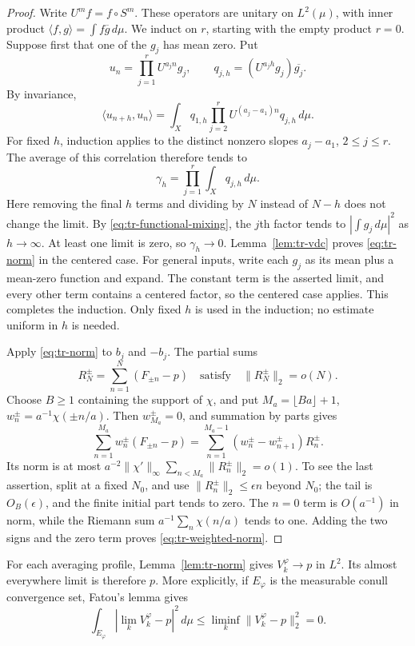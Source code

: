 \begin{proof}
Write \(U^mf=f\circ S^m\).  These operators are unitary on
\(L^2(\mu)\), with inner product
\(\langle f,g\rangle=\int f\overline g\,d\mu\).
We induct on \(r\), starting with the empty product \(r=0\).
Suppose first that one of the \(g_j\) has mean zero.  Put
\[
 u_n=\prod_{j=1}^rU^{a_jn}g_j,
 \qquad q_{j,h}=(U^{a_jh}g_j)\overline{g_j}.
\]
By invariance,
\[
 \langle u_{n+h},u_n\rangle
 =\int_Xq_{1,h}\prod_{j=2}^rU^{(a_j-a_1)n}q_{j,h}\,d\mu.
\]
For fixed \(h\), induction applies to the distinct nonzero slopes
\(a_j-a_1\), \(2\leq j\leq r\).  The average of this correlation
therefore tends to
\[
 \gamma_h=\prod_{j=1}^r\int_Xq_{j,h}\,d\mu.
\]
Here removing the final \(h\) terms and dividing by \(N\) instead
of \(N-h\) does not change the limit.  By
\eqref{eq:tr-functional-mixing}, the \(j\)th factor tends to
\(|\int g_j\,d\mu|^2\) as \(h\to\infty\).  At least one limit
is zero, so \(\gamma_h\to0\).  Lemma~\ref{lem:tr-vdc} proves
\eqref{eq:tr-norm} in the centered case.  For general inputs, write
each \(g_j\) as its mean plus a mean-zero function and expand.
The constant term is the asserted limit, and every other term
contains a centered factor, so the centered case applies.  This
completes the induction.  Only fixed \(h\) is used in the induction;
no estimate uniform in \(h\) is needed.

Apply \eqref{eq:tr-norm} to \(b_j\) and \(-b_j\).  The partial sums
\[
 R_N^\pm=\sum_{n=1}^N(F_{\pm n}-p)
 \quad\text{satisfy}\quad \|R_N^\pm\|_2=o(N).
\]
Choose \(B\geq1\) containing the support of \(\chi\), and put
\(M_a=\lfloor Ba\rfloor+1\), \(w_n^\pm=a^{-1}\chi(\pm n/a)\).
Then \(w_{M_a}^\pm=0\), and summation by parts gives
\[
 \sum_{n=1}^{M_a}w_n^\pm(F_{\pm n}-p)
 =\sum_{n=1}^{M_a-1}(w_n^\pm-w_{n+1}^\pm)R_n^\pm.
\]
Its norm is at most
\(a^{-2}\|\chi'\|_\infty\sum_{n<M_a}\|R_n^\pm\|_2=o(1)\).
To see the last assertion, split at a fixed \(N_0\), and use
\(\|R_n^\pm\|_2\leq\epsilon n\) beyond \(N_0\); the tail is
\(O_B(\epsilon)\), and the finite initial part tends to zero.
The \(n=0\) term is \(O(a^{-1})\) in norm, while the Riemann sum
\(a^{-1}\sum_n\chi(n/a)\) tends to one.  Adding the two signs and
the zero term proves \eqref{eq:tr-weighted-norm}.
\end{proof}

For each averaging profile, Lemma~\ref{lem:tr-norm} gives
\(V_k^\varphi\to p\) in \(L^2\).  Its almost everywhere limit
is therefore \(p\).  More explicitly, if \(E_\varphi\) is the
measurable conull convergence set, Fatou's lemma gives
\[
 \int_{E_\varphi}|\lim_kV_k^\varphi-p|^2\,d\mu
 \leq\liminf_k\|V_k^\varphi-p\|_2^2=0.
\]

